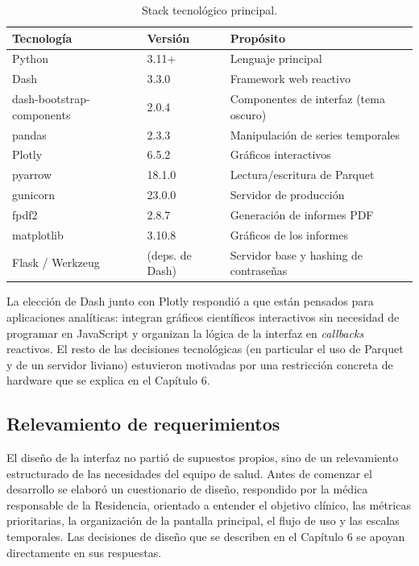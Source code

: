\begin{table}[h!]
\centering
\begin{tabular}{lll}
\hline
Tecnología & Versión & Propósito \\
\hline
Python & 3.11+ & Lenguaje principal \\
Dash & 3.3.0 & Framework web reactivo \\
dash-bootstrap-components & 2.0.4 & Componentes de interfaz (tema oscuro) \\
pandas & 2.3.3 & Manipulación de series temporales \\
Plotly & 6.5.2 & Gráficos interactivos \\
pyarrow & 18.1.0 & Lectura/escritura de Parquet \\
gunicorn & 23.0.0 & Servidor de producción \\
fpdf2 & 2.8.7 & Generación de informes PDF \\
matplotlib & 3.10.8 & Gráficos de los informes \\
Flask / Werkzeug & (deps. de Dash) & Servidor base y hashing de contraseñas \\
\hline
\end{tabular}
\caption{Stack tecnológico principal.}
\end{table}
La elección de Dash junto con Plotly respondió a que están pensados para aplicaciones analíticas: integran gráficos científicos interactivos sin necesidad de programar en JavaScript y organizan la lógica de la interfaz en \textit{callbacks} reactivos. El resto de las decisiones tecnológicas (en particular el uso de Parquet y de un servidor liviano) estuvieron motivadas por una restricción concreta de hardware que se explica en el Capítulo 6.\\


\subsection{Relevamiento de requerimientos}
El diseño de la interfaz no partió de supuestos propios, sino de un relevamiento estructurado de las necesidades del equipo de salud. Antes de comenzar el desarrollo se elaboró un cuestionario de diseño, respondido por la médica responsable de la Residencia, orientado a entender el objetivo clínico, las métricas prioritarias, la organización de la pantalla principal, el flujo de uso y las escalas temporales. Las decisiones de diseño que se describen en el Capítulo 6 se apoyan directamente en sus respuestas.\\

